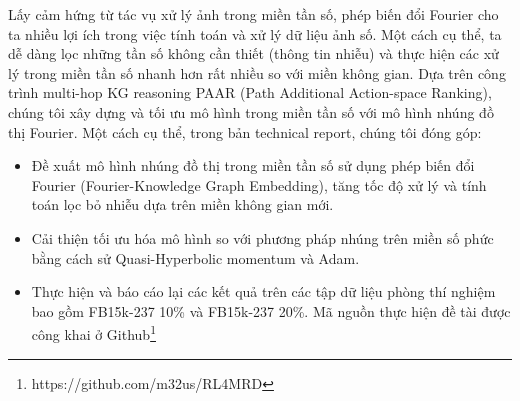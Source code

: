 Lấy cảm hứng từ tác vụ xử lý ảnh trong miền tần số, phép biến đổi Fourier cho ta nhiều lợi ích trong việc tính toán và xử lý dữ liệu ảnh số. Một cách cụ thể, ta dễ dàng lọc những tần số không cần thiết (thông tin nhiễu) và thực hiện các xử lý trong miền tần số nhanh hơn rất nhiều so với miền không gian. Dựa trên công trình multi-hop KG reasoning PAAR (Path Additional Action-space Ranking), chúng tôi xây dựng và tối ưu mô hình trong miền tần số với mô hình nhúng đồ thị Fourier. Một cách cụ thể, trong bản technical report, chúng tôi đóng góp:
\begin{itemize}
    \item Đề xuất mô hình nhúng đồ thị trong miền tần số sử dụng phép biến đổi Fourier (Fourier-Knowledge Graph Embedding), tăng tốc độ xử lý và tính toán lọc bỏ nhiễu dựa trên miền không gian mới.
    \item Cải thiện tối ưu hóa mô hình so với phương pháp nhúng trên miền số phức bằng cách sử Quasi-Hyperbolic momentum và Adam.
    \item Thực hiện và báo cáo lại các kết quả trên các tập dữ liệu phòng thí nghiệm bao gồm FB15k-237 10\% và FB15k-237 20\%. Mã nguồn thực hiện đề tài được công khai ở Github\footnote{https://github.com/m32us/RL4MRD}
\end{itemize}